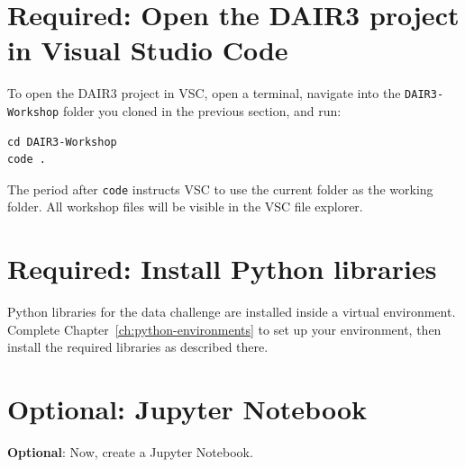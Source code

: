 \section{Required: Open the DAIR3 project in Visual Studio Code}\label{sec:vscstart}

To open the DAIR3 project in VSC, open a terminal, navigate into the
\texttt{DAIR3-Workshop} folder you cloned in the previous section,
and run:

\begin{verbatim}
cd DAIR3-Workshop
code .
\end{verbatim}

The period after \texttt{code} instructs VSC to use the current folder
as the working folder. All workshop files will be visible in the VSC
file explorer.

\section{Required: Install Python libraries}\label{sec:libraries}

Python libraries for the data challenge are installed inside a virtual
environment. Complete Chapter~\ref{ch:python-environments} to set up
your environment, then install the required libraries as described there.

\section{Optional: Jupyter Notebook}\label{sec:jupyter}

\textbf{Optional}: Now, create a Jupyter Notebook.

